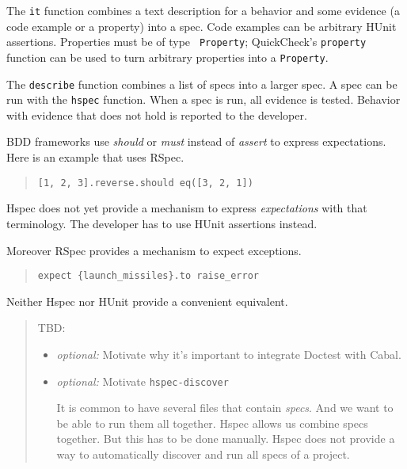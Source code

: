 \documentclass[preprint]{sigplanconf}
\begin{document}
\noindent The {\tt it} function combines a text description for a
behavior and some evidence (a code example or a property) into a spec.
Code examples can be arbitrary HUnit assertions.  Properties must be of type {\tt
Property}; QuickCheck's \texttt{property} function can be used to turn
arbitrary properties into a \texttt{Property}.

The \texttt{describe} function combines a list of specs into a larger spec.
A spec can be run with the \texttt{hspec} function.  When a spec is
run, all evidence is tested.  Behavior with evidence that does not
hold is reported to the developer.

BDD frameworks use \emph{should} or \emph{must} instead of
\emph{assert} to express expectations.  Here is an example that uses
RSpec.

\begin{quote}\small\begin{verbatim}
[1, 2, 3].reverse.should eq([3, 2, 1])
\end{verbatim}\end{quote}


\noindent Hspec does not yet provide a mechanism to express
\emph{expectations} with that terminology.  The developer has to use
HUnit assertions instead.

Moreover RSpec provides a mechanism to expect exceptions.

\begin{quote}\small\begin{verbatim}
expect {launch_missiles}.to raise_error
\end{verbatim}\end{quote}

\noindent Neither Hspec nor HUnit provide a convenient equivalent.


\begin{quote}
    TBD:
\begin{itemize}
    \item \emph{optional:} Motivate why it's important to integrate
        Doctest with
        Cabal.

    \item \emph{optional:} Motivate \verb|hspec-discover|

        It is common to have several files that contain \emph{specs}.
        And we want to be able to run them all together.  Hspec allows
        us combine specs together.  But this has to be done manually.
        Hspec does not provide a way to automatically discover and run
        all specs of a project.
\end{itemize}
\end{quote}
\end{document}

